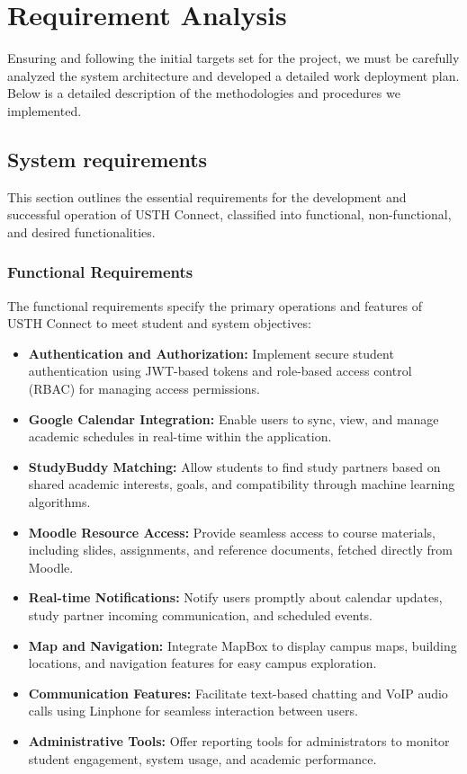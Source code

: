 \documentclass[12pt]{article}
\begin{document}
\section{Requirement Analysis}
Ensuring and following the initial targets set for the project, we must be carefully analyzed the system
architecture and developed a detailed work deployment plan. Below is a detailed description of
the methodologies and procedures we implemented.

\subsection{System requirements}
This section outlines the essential requirements for the development and successful operation of USTH Connect, classified into functional, non-functional, and desired functionalities.  

\subsubsection{Functional Requirements}
The functional requirements specify the primary operations and features of USTH Connect to meet student and system objectives:  
\begin{itemize}  
    \item \textbf{Authentication and Authorization:} Implement secure student authentication using JWT-based tokens and role-based access control (RBAC) for managing access permissions.  
    \item \textbf{Google Calendar Integration:} Enable users to sync, view, and manage academic schedules in real-time within the application.  
    \item \textbf{StudyBuddy Matching:} Allow students to find study partners based on shared academic interests, goals, and compatibility through machine learning algorithms.  
    \item \textbf{Moodle Resource Access:} Provide seamless access to course materials, including slides, assignments, and reference documents, fetched directly from Moodle.  
    \item \textbf{Real-time Notifications:} Notify users promptly about calendar updates, study partner incoming communication, and scheduled events.  
    \item \textbf{Map and Navigation:} Integrate MapBox to display campus maps, building locations, and navigation features for easy campus exploration.  
    \item \textbf{Communication Features:} Facilitate text-based chatting and VoIP audio calls using Linphone for seamless interaction between users.  
    \item \textbf{Administrative Tools:} Offer reporting tools for administrators to monitor student engagement, system usage, and academic performance.  
\end{itemize}  
\end{document}
